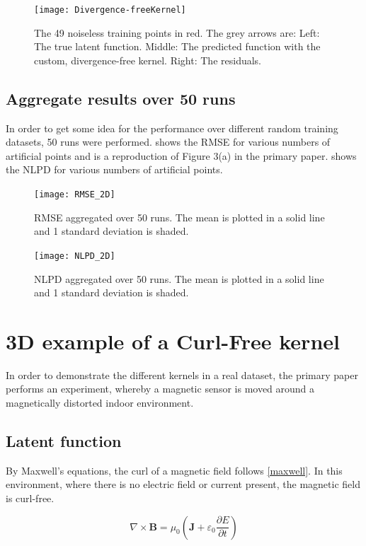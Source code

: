 \documentclass[12pt,a4paper,twoside]{report}
\theoremstyle{definition}
\begin{document}
\begin{figure}[ht]
	\centering
	\texttt{[image: Divergence-freeKernel]}
	\caption{The 49 noiseless training points in red. The grey arrows are: Left: The true latent function. Middle: The predicted function with the custom, divergence-free kernel. Right: The residuals.}
\end{figure}

\clearpage
\subsection{Aggregate results over 50 runs}

In order to get some idea for the performance over different random training datasets, 50 runs were performed.  shows the RMSE for various numbers of artificial points and is a reproduction of Figure 3(a) in the primary paper.  shows the NLPD for various numbers of artificial points.
 
\begin{figure}[ht]
	\centering
	\texttt{[image: RMSE\_2D]}
	\caption{RMSE aggregated over 50 runs. The mean is plotted in a solid line and 1 standard deviation is shaded.}
	\label{rmse2d}
\end{figure}

\begin{figure}[ht]
	\centering
	\texttt{[image: NLPD\_2D]}
	\caption{NLPD aggregated over 50 runs. The mean is plotted in a solid line and 1 standard deviation is shaded.}
	\label{nlpd2d}
\end{figure}

\section{3D example of a Curl-Free kernel}
In order to demonstrate the different kernels in a real dataset, the primary paper performs an experiment, whereby a magnetic sensor is moved around a magnetically distorted indoor environment.

\subsection{Latent function}
By Maxwell's equations, the curl of a magnetic field follows \cref{maxwell}. In this environment, where there is no electric field or current present, the magnetic field is curl-free.

\begin{equation}\label{maxwell}
	\nabla\times \mathbf B = \mu_0\left( \mathbf J+\varepsilon_0 \frac{\partial E}{\partial t}  \right) 
\end{equation}
\end{document}

